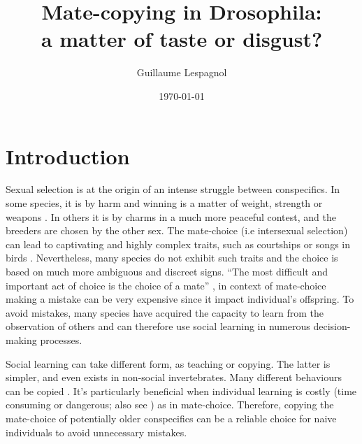 \documentclass[a4paper, 12pt]{article}
\title{\Huge Mate-copying in Drosophila:\\ a matter of taste or disgust?}
\author{Guillaume Lespagnol}
\date{\today}
\begin{document}
	
	\maketitle
	
	\tableofcontents
	
	\clearpage
	
	\section{Introduction}






	Sexual selection is at the origin of an intense struggle between conspecifics. In some species, it is by harm and winning is a matter of weight, strength or weapons \parencite{anderson_grey_1985, clutton-brock_functions_1982}. In others it is by charms in a much more peaceful contest, and the breeders are chosen by the other sex.
	The mate-choice (i.e intersexual selection) can lead to captivating and highly complex traits, such as courtships or songs in birds \parencite{danchin_ecologie_2005}. Nevertheless, many species do not exhibit such traits and the choice is based on much more ambiguous and discreet signs.
	“The most difficult and important act of choice is the choice of a mate” \parencite{fisher_evolution_1915}, in context of mate-choice making a mistake can be very expensive since it impact individual’s offspring.
	To avoid mistakes, many species have acquired the capacity to learn from the observation of others and can therefore use social learning in numerous decision-making processes.
	
	Social learning can take different form, as teaching or copying. The latter is simpler, and even exists in non-social invertebrates\parencite{coolen_social_2005,laidre_mark_e._how_2010}. 
	Many different behaviours can be copied \parencite{thornton_alex_multi-generational_2010, van_leeuwen_group-specific_2014}.
	 It’s particularly beneficial when individual learning is costly (time consuming or dangerous; also see \parencite{webster_m.m_social_2008}) as in mate-choice.
	 Therefore, copying the mate-choice of potentially older conspecifics can be a reliable choice for naive individuals to avoid unnecessary mistakes.
	
\end{document}
